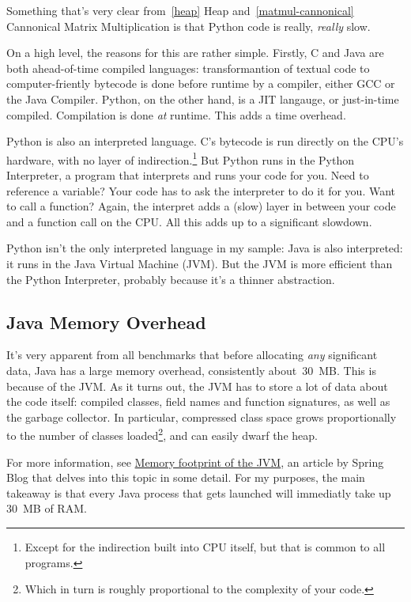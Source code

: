 \documentclass[12pt,letterpaper]{article}
\begin{document}
Something that's very clear from~\ref{heap} Heap and~\ref{matmul-cannonical}
Cannonical Matrix Multiplication is that Python code is really, \emph{really}
slow.

On a high level, the reasons for this are rather simple. Firstly, C and Java
are both ahead-of-time compiled languages: transformantion of textual code to
computer-friently bytecode is done before runtime by a compiler, either GCC or
the Java Compiler. Python, on the other hand, is a JIT langauge, or
just-in-time compiled. Compilation is done \emph{at} runtime. This adds a time
overhead.

Python is also an interpreted language. C's bytecode is run directly on the
CPU's hardware, with no layer of indirection.\footnote{Except for the
indirection built into CPU itself, but that is common to all programs.} But
Python runs in the Python Interpreter, a program that interprets and runs your
code for you. Need to reference a variable? Your code has to ask the
interpreter to do it for you. Want to call a function? Again, the interpret
adds a (slow) layer in between your code and a function call on the CPU. All
this adds up to a significant slowdown.

Python isn't the only interpreted language in my sample: Java is also
interpreted: it runs in the Java Virtual Machine (JVM). But the JVM is more
efficient than the Python Interpreter, probably because it's a thinner
abstraction.

\subsection{Java Memory Overhead}

It's very apparent from all benchmarks that before allocating \emph{any}
significant data, Java has a large memory overhead, consistently
about~\SI{30}{\mega B}. This is because of the JVM. As it turns out, the JVM
has to store a lot of data about the code itself: compiled classes, field names
and function signatures, as well as the garbage collector. In particular,
compressed class space grows proportionally to the number of classes
loaded\footnote{Which in turn is roughly proportional to the complexity of your
code.}, and can easily dwarf the heap.

For more information, see
\href{https://spring.io/blog/2019/03/11/memory-footprint-of-the-jvm}{Memory
footprint of the JVM}, an article by Spring Blog that delves into this topic in
some detail. For my purposes, the main takeaway is that every Java process that
gets launched will immediatly take up \SI{30}{\mega B} of RAM.
\end{document}
